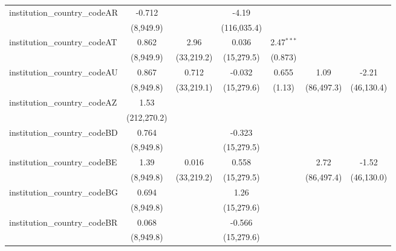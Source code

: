 \begin{tabular}{lcccccc}
   institution\_country\_codeAR          & -0.712        &               & -4.19         &               &              &   \\   
                                         & (8,949.9)     &               & (116,035.4)   &               &              &   \\   
   institution\_country\_codeAT          & 0.862         & 2.96          & 0.036         & 2.47$^{***}$  &              &   \\   
                                         & (8,949.9)     & (33,219.2)    & (15,279.5)    & (0.873)       &              &   \\   
   institution\_country\_codeAU          & 0.867         & 0.712         & -0.032        & 0.655         & 1.09         & -2.21\\   
                                         & (8,949.8)     & (33,219.1)    & (15,279.6)    & (1.13)        & (86,497.3)   & (46,130.4)\\   
   institution\_country\_codeAZ          & 1.53          &               &               &               &              &   \\   
                                         & (212,270.2)   &               &               &               &              &   \\   
   institution\_country\_codeBD          & 0.764         &               & -0.323        &               &              &   \\   
                                         & (8,949.8)     &               & (15,279.5)    &               &              &   \\   
   institution\_country\_codeBE          & 1.39          & 0.016         & 0.558         &               & 2.72         & -1.52\\   
                                         & (8,949.8)     & (33,219.2)    & (15,279.5)    &               & (86,497.4)   & (46,130.0)\\   
   institution\_country\_codeBG          & 0.694         &               & 1.26          &               &              &   \\   
                                         & (8,949.8)     &               & (15,279.6)    &               &              &   \\   
   institution\_country\_codeBR          & 0.068         &               & -0.566        &               &              &   \\   
                                         & (8,949.8)     &               & (15,279.6)    &               &              &   \\   

\end{tabular}

